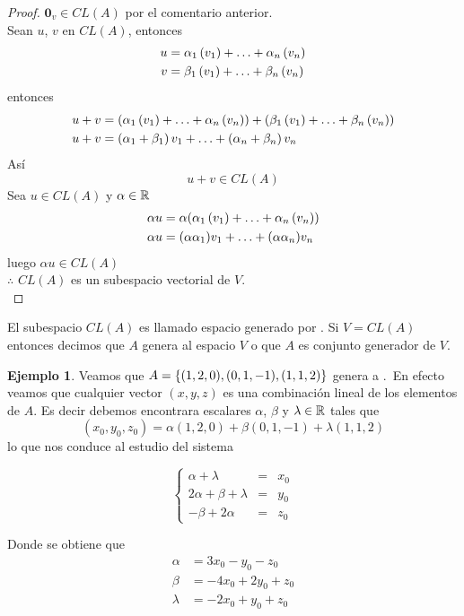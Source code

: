 \documentclass[10pt,a4paper]{report}
\theoremstyle{definition}
\newtheorem{ejemplo}{Ejemplo}[chapter]
\theoremstyle{remark}
\numberwithin{section}{chapter}
\numberwithin{equation}{chapter}
\numberwithin{tacounter}{chapter}
\begin{document}
\begin{proof}

$\mathbf{0}_v \in CL(A)$ por el comentario anterior.\\
Sean $u$, $v$ en $CL(A)$, entonces
\begin{align*}
u &= \alpha_1\left(v_1\right)  + \ldots +  \alpha_n\left(v_n\right) \\ 
v&= \beta_1\left(v_1\right)  + \ldots +  \beta_n\left(v_n\right) 
\end{align*}
entonces
\begin{align*}
u + v &= ( \alpha_1\left(v_1\right)  + \ldots +  \alpha_n\left(v_n\right) ) + ( \beta_1\left(v_1\right)  + \ldots +  \beta_n\left(v_n\right) )\\
u + v &=(\alpha_1 + \beta_1)\,v_1 + \ldots + (\alpha_n + \beta_n)\, v_n
\end{align*}
Así
$$u + v \in CL(A)$$
Sea $u \in CL(A)$ y $\alpha \in \mathbb{R}$
\begin{align*}
\alpha u &= \alpha( \alpha_1\left(v_1\right)  + \ldots +  \alpha_n\left(v_n\right) )\\
\alpha u &= (\alpha \alpha_1)v_1 + \ldots + (\alpha \alpha_n)v_n
\end{align*}
luego $\alpha u \in CL(A)$\\

$\therefore$ $CL(A)$ es un subespacio vectorial de $V$. \qedhere \\ %

\end{proof}
El subespacio $CL(A)$ es llamado espacio generado por . Si $V = CL(A)$ entonces decimos que $A$ genera al espacio $V$ o que $A$ es conjunto generador de $V$.

\begin{ejemplo}
Veamos que $A =  \left\{(1,2,0),(0,1,-1),(1,1,2) \right\} $ genera a \rtres .\
En efecto veamos que cualquier vector $(x,y,z)$ es una combinación lineal de los elementos de $A$. Es decir debemos encontrara escalares $\alpha$, $\beta$ y $\lambda \in \mathbb{R}$ tales que $$(x_0, y_0, z_0) = \alpha (1,2,0) + \beta (0,1,-1) + \lambda (1,1,2)$$
lo que nos conduce al estudio del sistema 

$$\left\{
\begin{array}{rcl}
\alpha + \lambda &=& x_0\\
2 \alpha + \beta + \lambda &=& y_0\\
- \beta + 2\alpha &=& z_0 
\end{array}
\right.$$

Donde se obtiene que 
\begin{align*}
\alpha &= 3x_0 - y_0 -z_0\\
\beta &=-4 x_0 +2 y_0 +z_0\\
\lambda &= -2 x_0 + y_0 +z_0 
\end{align*}

\end{ejemplo}
\end{document}
